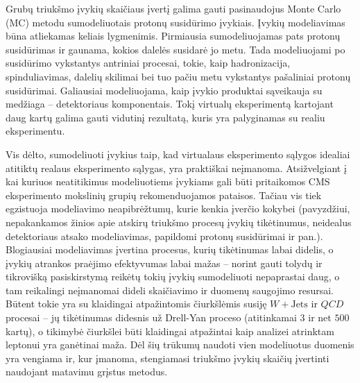\documentclass[a4paper, 12pt, oneside]{article}
\newcommand{\WJets}{W\! +\!\mathrm{Jets}}
\newcommand{\QCD}{QC\! D}
\begin{document}
Grubų triukšmo įvykių skaičiaus įvertį galima gauti pasinaudojus Monte Carlo (MC) metodu sumodeliuotais protonų susidūrimo įvykiais.
Įvykių modeliavimas būna atliekamas keliais lygmenimis.
Pirmiausia sumodeliuojamas pats protonų susidūrimas ir gaunama, kokios dalelės susidarė jo metu.
Tada modeliuojami po susidūrimo vykstantys antriniai procesai, tokie, kaip hadronizacija, spinduliavimas, dalelių skilimai bei
tuo pačiu metu vykstantys pašaliniai protonų susidūrimai.
Galiausiai modeliuojama, kaip įvykio produktai sąveikauja su medžiaga -- detektoriaus komponentais.
Tokį virtualų eksperimentą kartojant daug kartų galima gauti vidutinį rezultatą, kuris yra palyginamas su realiu eksperimentu.

Vis dėlto, sumodeliuoti įvykius taip, kad virtualaus eksperimento sąlygos idealiai atitiktų realaus eksperimento sąlygas,
yra praktiškai neįmanoma.
Atsižvelgiant į kai kuriuos neatitikimus modeliuotiems įvykiams gali būti pritaikomos CMS eksperimento mokslinių grupių
rekomenduojamos pataisos.
Tačiau vis tiek egzistuoja modeliavimo neapibrėžtumų, kurie kenkia įverčio kokybei (pavyzdžiui, nepakankamos žinios apie
atskirų triukšmo procesų įvykių tikėtinumus, neidealus detektoriaus atsako modeliavimas, papildomi protonų susidūrimai ir pan.).
Blogiausiai modeliavimas įvertina procesus, kurių tikėtinumas labai didelis, o įvykių atrankos praėjimo efektyvumas labai
mažas -- norint gauti tolydų ir tikrovišką pasiskirstymą reikėtų tokių įvykių sumodeliuoti nepaprastai daug, o tam
reikalingi neįmanomai dideli skaičiavimo ir duomenų saugojimo resursai.
Būtent tokie yra su klaidingai atpažintomis čiurkšlėmis susiję $\WJets$ ir $\QCD$ procesai -- jų tikėtinumas didesnis už
Drell-Yan proceso (atitinkamai $3$ ir net $500$ kartų), o tikimybė čiurkšlei būti klaidingai atpažintai kaip analizei
atrinktam leptonui yra ganėtinai maža. 
Dėl šių trūkumų naudoti vien modeliuotus duomenis yra vengiama ir, kur įmanoma, stengiamasi triukšmo įvykių skaičių
įvertinti naudojant matavimu grįstus metodus.
\end{document}
